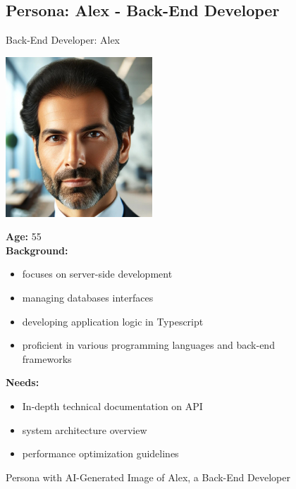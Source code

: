 \begin{figure}[h!]
\subsection*{Persona: Alex - Back-End Developer}
\begin{persona}{Back-End Developer: Alex}
\begin{tcbraster}[raster columns=2, raster column skip=5mm]
  \begin{tcolorbox}[width=0.2\linewidth, colback=white, colframe=white, boxrule=0pt, halign=center]
   \includegraphics[width=\linewidth, height=6cm, keepaspectratio]{Images/Alex.jpg}
  \end{tcolorbox}
  \begin{tcolorbox}[width=0.8\linewidth, colback=white, colframe=white, boxrule=0pt]
  \fontsize{10pt}{9.6pt}\selectfont
    \textbf{Age:} 55\\
    \textbf{Background:} 
    \begin{itemize}
        \item focuses on server-side development
        \item managing databases interfaces
        \item developing application logic in Typescript
        \item proficient in various programming languages and back-end frameworks
    \end{itemize}
    \textbf{Needs:}
        \begin{itemize}
        \item In-depth technical documentation on \ac{API}
        \item system architecture overview
        \item performance optimization guidelines
    \end{itemize}
  \end{tcolorbox}
\end{tcbraster}
\end{persona}
\caption{Persona with \ac{AI}-Generated Image of Alex, a Back-End Developer}
\label{fig:persona:alex}
\end{figure}

